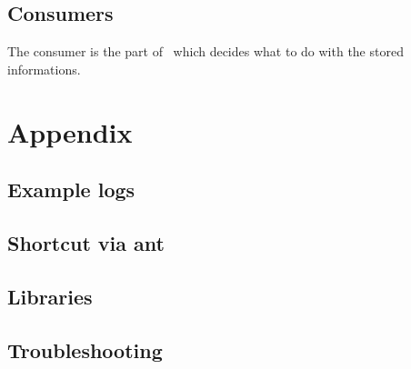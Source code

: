 \documentclass[a4paper, oneside, 11pt]{scrartcl}
\begin{document}
\subsection{Consumers}
The consumer is the part of \Kieker\ which decides what to do with the stored informations. 
\section{Appendix}
\subsection{Example logs}
\subsection{Shortcut via ant}
\subsection{Libraries}

\subsection{Troubleshooting}
\end{document}

